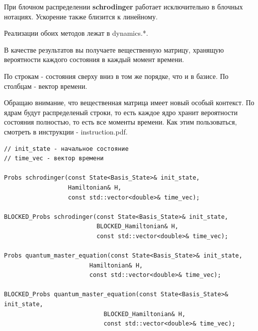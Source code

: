 \documentclass[12pt,fleqn]{article}
\begin{document}
    
    
        

        При блочном распределении \textbf{schrodinger} работает исключительно в блочных нотациях. Ускорение также близится к линейному.

        Реализации обоих методов лежат в \textsf{dynamics.*}.

        В качестве результатов вы получаете вещественную матрицу, хранящую вероятности каждого состояния в каждый момент времени.

        По строкам - состояния сверху вниз в том же порядке, что и в базисе.
        По столбцам - вектор времени.

        Обращаю внимание, что вещественная матрица имеет новый особый контекст. По ядрам будут распределеный строки, то есть каждое ядро хранит вероятности состояния полностью, то есть все моменты 
        времени. Как этим пользоваться, смотреть в инструкции - \textsf{instruction.pdf}.

\begin{mdframed}[linecolor=black, topline=true, bottomline=true,
    leftline=false, rightline=false]
\begin{verbatim}
// init_state - начальное состояние
// time_vec - вектор времени

Probs schrodinger(const State<Basis_State>& init_state,
                  Hamiltonian& H,
                  const std::vector<double>& time_vec);

BLOCKED_Probs schrodinger(const State<Basis_State>& init_state,
                          BLOCKED_Hamiltonian& H,
                          const std::vector<double>& time_vec);

Probs quantum_master_equation(const State<Basis_State>& init_state,
                        Hamiltonian& H,
                        const std::vector<double>& time_vec);

BLOCKED_Probs quantum_master_equation(const State<Basis_State>& init_state,
                            BLOCKED_Hamiltonian& H,
                            const std::vector<double>& time_vec);
\end{verbatim}
\end{mdframed}
\end{document}

